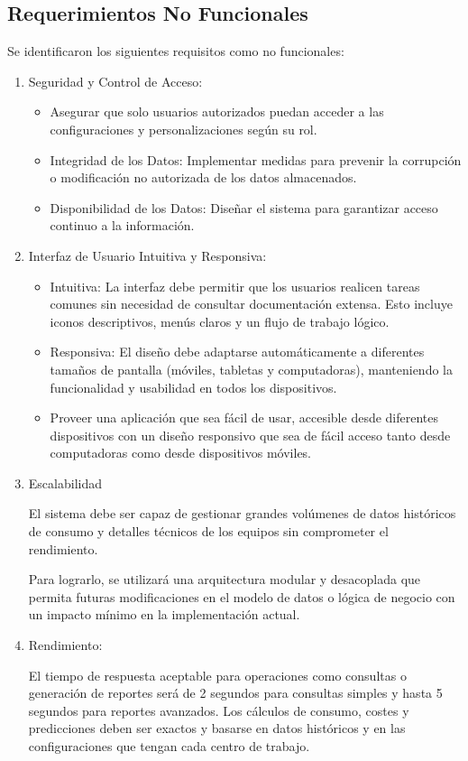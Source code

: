 \documentclass{article}
\begin{document}
\subsection{Requerimientos No Funcionales}

Se identificaron los siguientes requisitos como no funcionales:

\begin{enumerate}
\item Seguridad y Control de Acceso:
\begin{itemize}
\item Asegurar que solo usuarios autorizados puedan acceder a las configuraciones y personalizaciones según su rol.
\item Integridad de los Datos: Implementar medidas para prevenir la corrupción o modificación no autorizada de los datos almacenados.
\item Disponibilidad de los Datos: Diseñar el sistema para garantizar acceso continuo a la información.
\end{itemize}

\item Interfaz de Usuario Intuitiva y Responsiva:
\begin{itemize}
\item Intuitiva: La interfaz debe permitir que los usuarios realicen tareas comunes sin necesidad de consultar documentación extensa. Esto incluye iconos descriptivos, menús claros y un flujo de trabajo lógico.
\item Responsiva: El diseño debe adaptarse automáticamente a diferentes tamaños de pantalla (móviles, tabletas y computadoras), manteniendo la funcionalidad y usabilidad en todos los dispositivos.
\item Proveer una aplicación que sea fácil de usar, accesible desde diferentes dispositivos con un diseño responsivo que sea de fácil acceso tanto desde computadoras como desde dispositivos móviles. 
\end{itemize}

\item Escalabilidad

El sistema debe ser capaz de gestionar grandes volúmenes de datos históricos de consumo y detalles técnicos de los equipos sin comprometer el rendimiento.

Para lograrlo, se utilizará una arquitectura modular y desacoplada que permita futuras modificaciones en el modelo de datos o lógica de negocio con un impacto mínimo en la implementación actual.

\item Rendimiento:

El tiempo de respuesta aceptable para operaciones como consultas o generación de reportes será de 2 segundos para consultas simples y hasta 5 segundos para reportes avanzados. Los cálculos de consumo, costes y predicciones deben ser exactos y basarse en datos históricos y en las configuraciones que tengan cada centro de trabajo. 
\end{enumerate}
\end{document}
